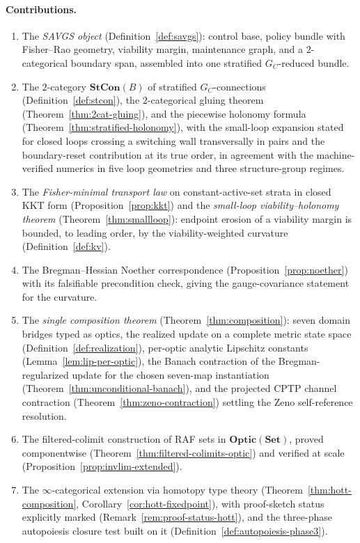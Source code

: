 \documentclass[11pt,a4paper]{article}
\theoremstyle{plain}
\theoremstyle{definition}
\theoremstyle{remark}
\newcommand{\Optic}{\mathbf{Optic}}
\begin{document}
\paragraph{Contributions.}
\begin{enumerate}[leftmargin=*,itemsep=2pt]
\item The \emph{SAVGS object}
(Definition~\ref{def:savgs}): control base, policy bundle with
Fisher--Rao geometry, viability margin, maintenance graph, and a
$2$-categorical boundary span, assembled into one stratified
$G_C$-reduced bundle.
\item The $2$-category $\mathbf{StCon}(B)$ of stratified
$G_C$-connections (Definition~\ref{def:stcon}), the
$2$-categorical gluing theorem (Theorem~\ref{thm:2cat-gluing}), and
the piecewise holonomy formula
(Theorem~\ref{thm:stratified-holonomy}), with the small-loop
expansion stated for closed loops crossing a switching wall
transversally in pairs and the boundary-reset contribution at its
true order, in agreement with the machine-verified numerics in
five loop geometries and three structure-group regimes.
\item The \emph{Fisher-minimal transport law} on
constant-active-set strata in closed KKT form
(Proposition~\ref{prop:kkt}) and the \emph{small-loop
viability--holonomy theorem} (Theorem~\ref{thm:smallloop}): endpoint
erosion of a viability margin is bounded, to leading order, by the
viability-weighted curvature
(Definition~\ref{def:kv}).
\item The Bregman--Hessian Noether correspondence
(Proposition~\ref{prop:noether}) with its falsifiable precondition
check, giving the gauge-covariance statement for the curvature.
\item The \emph{single composition theorem}
(Theorem~\ref{thm:composition}): seven domain bridges typed as
optics, the realized update on a complete metric state space
(Definition~\ref{def:realization}), per-optic analytic Lipschitz
constants (Lemma~\ref{lem:lip-per-optic}), the Banach contraction
of the Bregman-regularized update for the chosen seven-map
instantiation (Theorem~\ref{thm:unconditional-banach}), and the
projected CPTP channel contraction
(Theorem~\ref{thm:zeno-contraction}) settling the Zeno
self-reference resolution.
\item The filtered-colimit construction of RAF sets in
$\Optic(\mathbf{Set})$, proved componentwise
(Theorem~\ref{thm:filtered-colimits-optic}) and verified at scale
(Proposition~\ref{prop:invlim-extended}).
\item The $\infty$-categorical extension via homotopy type theory
(Theorem~\ref{thm:hott-composition},
Corollary~\ref{cor:hott-fixedpoint}), with proof-sketch status
explicitly marked (Remark~\ref{rem:proof-status-hott}), and the
three-phase autopoiesis closure test built on it
(Definition~\ref{def:autopoiesis-phase3}).
\end{enumerate}
\end{document}
